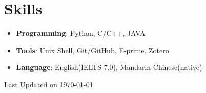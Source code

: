 \documentclass[letterpaper,11pt]{article}
\begin{document}
\section{Skills}
    \vspace{2pt}
    \begin{itemize}[leftmargin=0.15in, label={}]
    \vspace{-4pt}
    \item \textbf{Programming}: Python, C/C++, JAVA\\
    \vspace{-4pt}
    \item \textbf{Tools}{: Unix Shell, Git/GitHub, E-prime, Zotero}  \\
    \vspace{-4pt}
    \item \textbf{Language}: English(IELTS 7.0), Mandarin Chinese(native)
    \end{itemize}
    \vspace{-30pt}

\begin{flushright}
  \color{gray}
  \item Last Updated on \today
\end{flushright}
\end{document}
